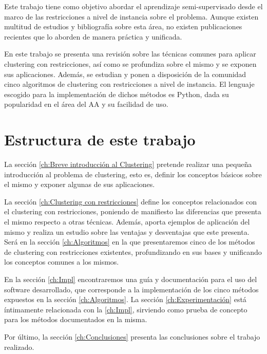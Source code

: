 Este trabajo tiene como objetivo abordar el aprendizaje semi-supervisado desde el marco de las restricciones a nivel de instancia sobre el problema. Aunque existen multitud de estudios y bibliografía sobre esta área, no existen publicaciones recientes que lo aborden de manera práctica y unificada.

En este trabajo se presenta una revisión sobre las técnicas comunes para aplicar clustering con restricciones, así como se profundiza sobre el mismo y se exponen sus aplicaciones. Además, se estudian y ponen a disposición de la comunidad cinco algoritmos de clustering con restricciones a nivel de instancia. El lenguaje escogido para la implementación de dichos métodos es Python, dada su popularidad en el área del \acf{AA} y su facilidad de uso.

\section{Estructura de este trabajo}

La sección \ref{ch:Breve introducción al Clustering} pretende realizar una pequeña introducción al problema de clustering, esto es, definir los conceptos básicos sobre el mismo y exponer algunas de sus aplicaciones.

La sección \ref{ch:Clustering con restricciones} define los conceptos relacionados con el clustering con restricciones, poniendo de manifiesto las diferencias que presenta el mismo respecto a otras técnicas. Además, aporta ejemplos de aplicación del mismo y realiza un estudio sobre las ventajas y desventajas que este presenta. Será en la sección \ref{ch:Algoritmos} en la que presentaremos cinco de los métodos de clustering con restricciones existentes, profundizando en sus bases y unificando los conceptos comunes a los mismos.

En la sección \ref{ch:Impl} encontraremos una guía y documentación para el uso del software desarrollado, que corresponde a la implementación de los cinco métodos expuestos en la sección \ref{ch:Algoritmos}. La sección \ref{ch:Experimentación} está íntimamente relacionada con la \ref{ch:Impl}, sirviendo como prueba de concepto para los métodos documentados en la misma.

Por último, la sección \ref{ch:Conclusiones} presenta las conclusiones sobre el trabajo realizado.































